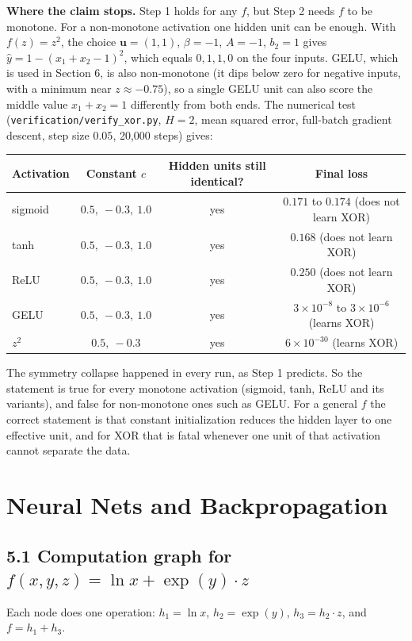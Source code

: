 \documentclass[11pt]{article}
\begin{document}
\textbf{Where the claim stops.} Step 1 holds for any $f$, but Step 2 needs $f$ to be monotone. For a non-monotone activation one hidden unit can be enough. With $f(z) = z^2$, the choice $\mathbf{u} = (1,1)$, $\beta = -1$, $A = -1$, $b_2 = 1$ gives $\hat y = 1-(x_1+x_2-1)^2$, which equals $0,1,1,0$ on the four inputs. GELU, which is used in Section 6, is also non-monotone (it dips below zero for negative inputs, with a minimum near $z\approx-0.75$), so a single GELU unit can also score the middle value $x_1+x_2 = 1$ differently from both ends. The numerical test (\texttt{verification/verify\_xor.py}, $H=2$, mean squared error, full-batch gradient descent, step size $0.05$, 20{,}000 steps) gives:
\begin{center}\small
\begin{tabular}{lccc}
\toprule
Activation & Constant $c$ & Hidden units still identical? & Final loss\\
\midrule
sigmoid & $0.5,\ -0.3,\ 1.0$ & yes & $0.171$ to $0.174$ (does not learn XOR)\\
tanh & $0.5,\ -0.3,\ 1.0$ & yes & $0.168$ (does not learn XOR)\\
ReLU & $0.5,\ -0.3,\ 1.0$ & yes & $0.250$ (does not learn XOR)\\
GELU & $0.5,\ -0.3,\ 1.0$ & yes & $3\times10^{-8}$ to $3\times10^{-6}$ (learns XOR)\\
$z^2$ & $0.5,\ -0.3$ & yes & $6\times10^{-30}$ (learns XOR)\\
\bottomrule
\end{tabular}
\end{center}
The symmetry collapse happened in every run, as Step 1 predicts. So the statement is true for every monotone activation (sigmoid, tanh, ReLU and its variants), and false for non-monotone ones such as GELU. For a general $f$ the correct statement is that constant initialization reduces the hidden layer to one effective unit, and for XOR that is fatal whenever one unit of that activation cannot separate the data.

\section{Neural Nets and Backpropagation}

\subsection*{5.1 Computation graph for $f(x,y,z) = \ln x + \exp(y)\cdot z$}
Each node does one operation: $h_1 = \ln x$, $h_2 = \exp(y)$, $h_3 = h_2\cdot z$, and $f = h_1 + h_3$.
\end{document}
